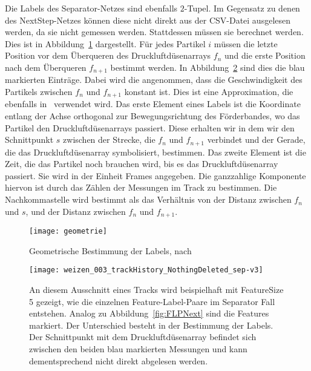 Die Labels des Separator-Netzes sind ebenfalls \(2\)-Tupel.
Im Gegensatz zu denen des NextStep-Netzes können diese nicht direkt aus der CSV-Datei ausgelesen werden, da sie nicht gemessen werden.
Stattdessen müssen sie berechnet werden.
Dies ist in Abbildung~\ref{fig:Schnittpunkt} dargestellt.
Für jedes Partikel \(i\) müssen die letzte Position vor dem Überqueren des Druckluftdüsenarrays \(f_n\) 
und die erste Position nach dem Überqueren \(f_{n+1}\) bestimmt werden.
In Abbildung~\ref{fig:FLPSep} sind dies die blau markierten Einträge. 
Dabei wird die angenommen, dass die Geschwindigkeit des Partikels zwischen \(f_n\) und \(f_{n+1}\) konstant ist.
Dies ist eine Approximation, die ebenfalls in~\cite{Pfaff2018} verwendet wird.
Das erste Element eines Labels ist die Koordinate entlang der Achse orthogonal zur Bewegungsrichtung des Förderbandes, wo das Partikel den Druckluftdüsenarrays passiert.
Diese erhalten wir in dem wir den Schnittpunkt \(s\) zwischen der Strecke, die \(f_n\) und \(f_{n+1}\) verbindet und 
der Gerade, die das Druckluftdüsenarray symbolisiert, bestimmen.
Das zweite Element ist die Zeit, die das Partikel noch brauchen wird, bis es das Druckluftdüsenarray passiert.
Sie wird in der Einheit Frames angegeben.
Die ganzzahlige Komponente hiervon ist durch das Zählen der Messungen im Track zu bestimmen.
Die Nachkommastelle wird bestimmt als das Verhältnis von der Distanz zwischen \(f_n\) und \(s\), 
und der Distanz zwischen \(f_n\) und \(f_{n+1}\).

\begin{figure}[h]
	\centering
	\texttt{[image: geometrie]}
	\caption{Geometrische Bestimmung der Labels, nach \cite{Pfaff2018}}
	\label{fig:Schnittpunkt}
\end{figure}

\begin{figure}[h]
	\centering
	\texttt{[image: weizen\_003\_trackHistory\_NothingDeleted\_sep-v3]}
	\caption[Beispiel Feature-Label-Paar Separator]{An diesem Ausschnitt eines Tracks wird beispielhaft mit FeatureSize 5 gezeigt, wie die einzelnen Feature-Label-Paare im Separator Fall entstehen.
	Analog zu Abbildung~\ref{fig:FLPNext} sind die Features markiert. Der Unterschied besteht in der Bestimmung der Labels. 
	Der Schnittpunkt mit dem Druckluftdüsenarray befindet sich zwischen den beiden blau markierten Messungen und kann dementsprechend nicht direkt abgelesen werden.}
	\label{fig:FLPSep}
\end{figure}



